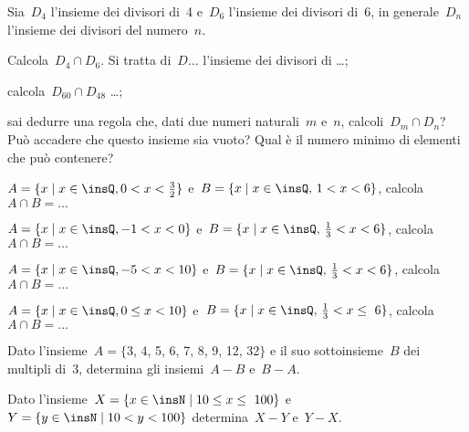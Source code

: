 \begin{esercizio}
Sia~$D_{4}$ l'insieme dei divisori di~4 e~$D_{6}$ l'insieme dei divisori di~6, in
generale~$D_{n}$ l'insieme dei divisori del numero~$n$.

\begin{enumeratea}
 \item Calcola~$D_{4}\cap D_{6}$. Si tratta di~$D\ldots$ l'insieme dei divisori di \ldots;
 \item calcola~$D_{60}\cap D_{48}$ \ldots;
 \item sai dedurre una regola che, dati due numeri naturali~$m$ e~$n$,
calcoli~$D_{m}\cap D_{n}$? Può accadere che questo insieme sia
vuoto? Qual è il numero minimo di elementi che può contenere?
\end{enumeratea}
\end{esercizio}

\begin{esercizio}
$A=\{x\mid x\in\insQ,0<x<\frac{3}{2}\}$ e~$B=\{x\mid x\in\insQ\text{, }1<x<6\}$, calcola~$A\cap B=\ldots$
\end{esercizio}

\begin{esercizio}
$A=\{x\mid x\in\insQ,-1<x<0\}$ e~$B=\{x\mid x\in\insQ\text{, }\frac{1}{3}<x<6\}$, calcola~$A\cap B=\ldots$
\end{esercizio}

\begin{esercizio}
$A=\{x\mid x\in\insQ,-5<x<10\}$ e~$B=\{x\mid x\in\insQ\text{, }\frac{1}{3}<x<6\}$, calcola~$A\cap B=\ldots$
\end{esercizio}

\begin{esercizio}
$A=\{x\mid x\in\insQ,0\le x<10\}$ e~$B=\{x\mid x\in\insQ\text{, }\frac{1}{3}<x\le~6\}$, calcola~$A\cap B=\ldots$
\end{esercizio}

\begin{esercizio}
Dato l'insieme~$A=\{$3, 4, 5, 6, 7, 8, 9, 12, 32$\}$ e il suo sottoinsieme~$B$ dei multipli di~3, determina gli
insiemi~$A-B$ e~$B-A$.
\end{esercizio}

\begin{esercizio}
Dato l'insieme~$X=\{x\in\insN\mid 10\le x\le~100\}$ e~$Y=\{y\in\insN\mid 10<y<100\}$ determina~$X-Y$ e~$Y-X$.
\end{esercizio}

